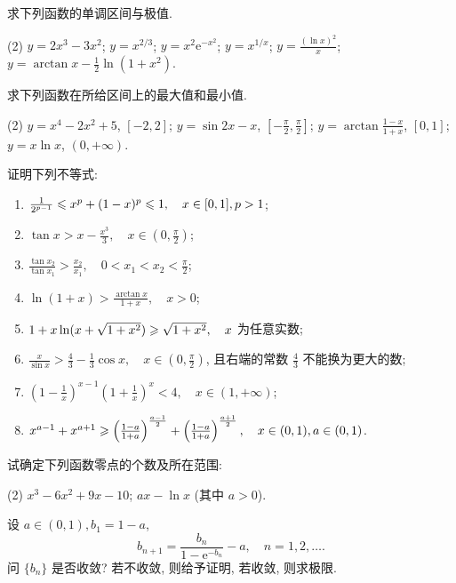 \begin{exercise}[3.3.21]
    求下列函数的单调区间与极值.
    \begin{tasks}[label=(\arabic*)](2)
        \task $y = 2x^3-3x^2$;
        \task $y = x^{2/3}$;
        \task $y = x^2\mathrm{e}^{-x^2}$;
        \task $y = x^{1/x}$;
        \task $y = \frac{(\ln x)^2}{x}$;
        \task $y = \arctan x - \frac{1}{2}\ln(1+x^2)$.
    \end{tasks}
\end{exercise}

\begin{exercise}[3.3.22]
    求下列函数在所给区间上的最大值和最小值.
    \begin{tasks}[label=(\arabic*)](2)
        \task $y = x^4 - 2x^2+5$, $[ -2, 2]$;
        \task $y = \sin 2x - x$, $[-\frac{\pi}{2}, \frac{\pi}{2}]$;
        \task $y = \arctan\frac{1-x}{1+x}$, $[0,1]$;
        \task $y = x\ln x$, $(0, +\infty)$.
    \end{tasks}
\end{exercise}

\begin{exercise}[3.3.23]
    证明下列不等式:
    \begin{enumerate}
        \item $\frac{1}{2^{p-1}} \leqslant x^p+(1-x)^p \leqslant 1, \quad x \in [0,1], p>1$;
        \item $\tan x > x - \frac{x^3}{3}, \quad x \in (0, \frac{\pi}{2})$;
        \item $\frac{\tan x_2}{\tan x_1} > \frac{x_2}{x_1}, \quad 0<x_1<x_2<\frac{\pi}{2}$;
        \item $\ln(1+x) > \frac{\arctan x}{1+x}, \quad x>0$;
        \item $1+x\ln(x+\sqrt{1+x^2}) \geqslant \sqrt{1+x^2}, \quad x$ 为任意实数;
        \item $\frac{x}{\sin x} > \frac{4}{3} - \frac{1}{3}\cos x, \quad x \in (0, \frac{\pi}{2})$, 且右端的常数 $\frac{4}{3}$ 不能换为更大的数;
        \item $(1-\frac{1}{x})^{x-1} (1+\frac{1}{x})^x < 4, \quad x \in (1, +\infty)$;
        \item $x^{a-1}+x^{a+1} \geqslant \left(\frac{1-a}{1+a}\right)^{\frac{a-1}{2}} + \left(\frac{1-a}{1+a}\right)^{\frac{a+1}{2}}, \quad x \in (0,1), a \in (0,1)$.
    \end{enumerate}
\end{exercise}

\begin{exercise}[3.3.24]
    试确定下列函数零点的个数及所在范围:
    \begin{tasks}[label=(\arabic*)](2)
        \task $x^3-6x^2+9x-10$;
        \task $ax-\ln x$ (其中 $a>0$).
    \end{tasks}
\end{exercise}

\begin{exercise}[3.3.25]
    设 $a \in (0,1), b_1=1-a$,
    $$ b_{n+1} = \frac{b_n}{1-\mathrm{e}^{-b_n}} - a, \quad n=1,2,\dots. $$
    问 $\{b_n\}$ 是否收敛? 若不收敛, 则给予证明, 若收敛, 则求极限.
\end{exercise}


\newpage
